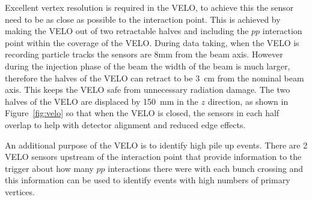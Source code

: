 Excellent vertex resolution is required in the VELO, to achieve this the sensor need to be as close as possible to the interaction point. This is achieved by making the VELO out of two retractable halves and including the $pp$ interaction point within the coverage of the VELO. 
During data taking, when the VELO is recording particle tracks the sensors are 8mm from the beam axis. However during the injection phase of the beam the width of the beam is much larger, therefore the halves of the VELO can retract to be 3~cm from the nominal beam axis. This keeps the VELO safe from unnecessary radiation damage. The two halves of the VELO are displaced by 150~mm in the $z$ direction, as shown in Figure~\ref{fig:velo} so that when the VELO is closed, the sensors in each half overlap to help with detector alignment and reduced edge effects. 



An additional purpose of the VELO is to identify high pile up events. There are 2 VELO sensors upstream of the interaction point that provide information to the trigger about how many $pp$ interactions there were with each bunch crossing and this information can be used to identify events with high numbers of primary vertices. %

